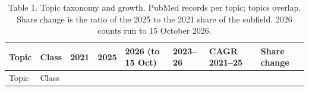 \documentclass[11pt]{article}
\begin{document}
\begin{scriptsize}

\begin{longtable}[]{@{}
  >{\raggedright\arraybackslash}p{}
  >{\raggedright\arraybackslash}p{}
  >{\raggedright\arraybackslash}p{}
  >{\raggedright\arraybackslash}p{}
  >{\raggedright\arraybackslash}p{}
  >{\raggedright\arraybackslash}p{}
  >{\raggedright\arraybackslash}p{}
  >{\raggedright\arraybackslash}p{}@{}}
\caption{Table 1. Topic taxonomy and growth. PubMed records per topic;
topics overlap. Share change is the ratio of the 2025 to the 2021 share
of the subfield. 2026 counts run to 15 October 2026.}\tabularnewline
\toprule\noalign{}
\begin{minipage}[b]{\linewidth}\raggedright
Topic
\end{minipage} & \begin{minipage}[b]{\linewidth}\raggedright
Class
\end{minipage} & \begin{minipage}[b]{\linewidth}\raggedright
2021
\end{minipage} & \begin{minipage}[b]{\linewidth}\raggedright
2025
\end{minipage} & \begin{minipage}[b]{\linewidth}\raggedright
2026 (to 15 Oct)
\end{minipage} & \begin{minipage}[b]{\linewidth}\raggedright
2023--26
\end{minipage} & \begin{minipage}[b]{\linewidth}\raggedright
CAGR 2021--25
\end{minipage} & \begin{minipage}[b]{\linewidth}\raggedright
Share change
\end{minipage} \\
\midrule\noalign{}
\endfirsthead
\toprule\noalign{}
\begin{minipage}[b]{\linewidth}\raggedright
Topic
\end{minipage} & \begin{minipage}[b]{\linewidth}\raggedright
Class
\end{minipage} & \begin{minipage}[b]{\linewidth}\raggedright

\end{minipage}
\end{longtable}
\end{scriptsize}
\end{document}

